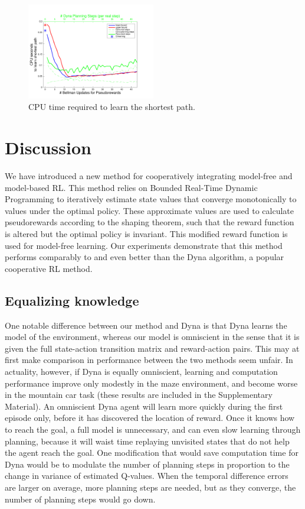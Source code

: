 \documentclass[letterpaper]{article}
\begin{document}
\begin{figure}[H]
\centering
\includegraphics[width=0.5\textwidth]{MC_cpus_vs_PRiterations_DYNA_toGoal}
\caption{CPU time required to learn the shortest path.}
\label{fig:mc2}
\end{figure}

\section{Discussion}

We have introduced a new method for cooperatively integrating model-free and model-based RL. This method relies on Bounded Real-Time Dynamic Programming to iteratively estimate state values that converge monotonically to values under the optimal policy. These approximate values are used to calculate pseudorewards according to the shaping theorem, such that the reward function is altered but the optimal policy is invariant. This modified reward function is used for model-free learning. Our experiments demonstrate that this method performs comparably to and even better than the Dyna algorithm, a popular cooperative RL method.

\subsection{Equalizing knowledge}

One notable difference between our method and Dyna is that Dyna learns the model of the environment, whereas our model is omniscient in the sense that it is given the full state-action transition matrix and reward-action pairs. This may at first make comparison in performance between the two methods seem unfair. In actuality, however, if Dyna is equally omniscient, learning and computation performance improve only modestly in the maze environment, and become worse in the mountain car task (these results are included in the Supplementary Material). An omniscient Dyna agent will learn more quickly during the first episode only, before it has discovered the location of reward. Once it knows how to reach the goal, a full model is unnecessary, and can even slow learning through planning, because it will waist time replaying unvisited states that do not help the agent reach the goal. One modification that would save computation time for Dyna would be to modulate the number of planning steps in proportion to the change in variance of estimated Q-values. When the temporal difference errors are larger on average, more planning steps are needed, but as they converge, the number of planning steps would go down.
\end{document}
